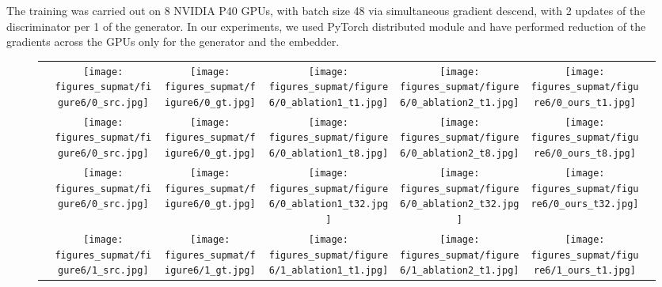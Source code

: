 \documentclass[10pt,twocolumn,letterpaper]{article}
\begin{document}
The training was carried out on 8 NVIDIA P40 GPUs, with batch size 48 via simultaneous gradient descend, with 2 updates of the discriminator per 1 of the generator. In our experiments, we used PyTorch distributed module and have performed reduction of the gradients across the GPUs only for the generator and the embedder.

\begin{figure*}
    \centering
    \setlength{\wid}{0.179\textwidth}
    \addtolength{\tabcolsep}{-4pt}
    \begin{tabular}{m{0.6cm}c:ccccc}
        &
        \texttt{[image: figures\_supmat/figure6/0\_src.jpg]}
        \;&\;
        \texttt{[image: figures\_supmat/figure6/0\_gt.jpg]}&
        \texttt{[image: figures\_supmat/figure6/0\_ablation1\_t1.jpg]}&
        \texttt{[image: figures\_supmat/figure6/0\_ablation2\_t1.jpg]}&
        \texttt{[image: figures\_supmat/figure6/0\_ours\_t1.jpg]}\\
        &
        \texttt{[image: figures\_supmat/figure6/0\_src.jpg]}
        \;&\;
        \texttt{[image: figures\_supmat/figure6/0\_gt.jpg]}&
        \texttt{[image: figures\_supmat/figure6/0\_ablation1\_t8.jpg]}&
        \texttt{[image: figures\_supmat/figure6/0\_ablation2\_t8.jpg]}&
        \texttt{[image: figures\_supmat/figure6/0\_ours\_t8.jpg]}\\
        &
        \texttt{[image: figures\_supmat/figure6/0\_src.jpg]}
        \;&\;
        \texttt{[image: figures\_supmat/figure6/0\_gt.jpg]}&
        \texttt{[image: figures\_supmat/figure6/0\_ablation1\_t32.jpg]}&
        \texttt{[image: figures\_supmat/figure6/0\_ablation2\_t32.jpg]}&
        \texttt{[image: figures\_supmat/figure6/0\_ours\_t32.jpg]}\\
        &
        \texttt{[image: figures\_supmat/figure6/1\_src.jpg]}
        \;&\;
        \texttt{[image: figures\_supmat/figure6/1\_gt.jpg]}&
        \texttt{[image: figures\_supmat/figure6/1\_ablation1\_t1.jpg]}&
        \texttt{[image: figures\_supmat/figure6/1\_ablation2\_t1.jpg]}&
        \texttt{[image: figures\_supmat/figure6/1\_ours\_t1.jpg]}\\

\end{tabular}
\end{figure*}
\end{document}

